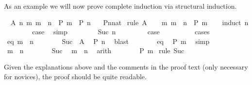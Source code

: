 \begin{isabellebody}
\begin{isamarkuptext}
As an example we will now prove complete induction via
structural induction.%
\end{isamarkuptext}%
\isamarkuptrue%
\ \ A{\isacharcolon}\ {\isachardoublequote}{\isacharparenleft}{\isasymAnd}n{\isachardot}\ {\isacharparenleft}{\isasymAnd}m{\isachardot}\ m\ {\isacharless}\ n\ {\isasymLongrightarrow}\ P\ m{\isacharparenright}\ {\isasymLongrightarrow}\ P\ n{\isacharparenright}{\isachardoublequote}\isanewline
\ \ \ {\isachardoublequote}P{\isacharparenleft}n{\isacharcolon}{\isacharcolon}nat{\isacharparenright}{\isachardoublequote}\isanewline
\isamarkupfalse%
\ {\isacharparenleft}rule\ A{\isacharparenright}\isanewline
\ \ \isamarkupfalse%
\ {\isachardoublequote}{\isasymAnd}m{\isachardot}\ m\ {\isacharless}\ n\ {\isasymLongrightarrow}\ P\ m{\isachardoublequote}\isanewline
\ \ \isamarkupfalse%
\ {\isacharparenleft}induct\ n{\isacharparenright}\isanewline
\ \ \ \ \isamarkupfalse%
\ {}\ \isamarkupfalse%
\ {\isacharquery}case\ \isamarkupfalse%
\ simp\isanewline
\ \ \isamarkupfalse%
\isanewline
\ \ \ \ \isamarkupfalse%
\ {\isacharparenleft}Suc\ n{\isacharparenright}\ \ \ %
\isanewline
\ \ \ \ \isamarkupfalse%
\ {\isacharquery}case\ \ \ \ %
\isanewline
\ \ \ \ \isamarkupfalse%
\ cases\isanewline
\ \ \ \ \ \ \isamarkupfalse%
\ eq{\isacharcolon}\ {\isachardoublequote}m\ {\isacharequal}\ n{\isachardoublequote}\isanewline
\ \ \ \ \ \ \isamarkupfalse%
\ Suc\ \ A\ \isamarkupfalse%
\ {\isachardoublequote}P\ n{\isachardoublequote}\ \isamarkupfalse%
\ blast\isanewline
\ \ \ \ \ \ \isamarkupfalse%
\ eq\ \isamarkupfalse%
\ {\isachardoublequote}P\ m{\isachardoublequote}\ \isamarkupfalse%
\ simp\isanewline
\ \ \ \ \isamarkupfalse%
\isanewline
\ \ \ \ \ \ \isamarkupfalse%
\ {\isachardoublequote}m\ {\isasymnoteq}\ n{\isachardoublequote}\isanewline
\ \ \ \ \ \ \isamarkupfalse%
\ Suc\ \isamarkupfalse%
\ {\isachardoublequote}m\ {\isacharless}\ n{\isachardoublequote}\ \isamarkupfalse%
\ arith\isanewline
\ \ \ \ \ \ \isamarkupfalse%
\ {\isachardoublequote}P\ m{\isachardoublequote}\ \isamarkupfalse%
rule\ Suc{\isacharparenright}\isanewline
\ \ \ \ \isamarkupfalse%
\isanewline
\ \ \isamarkupfalse%
\isanewline
\isamarkupfalse%
\isamarkupfalse%
%
\begin{isamarkuptext}%
\noindent Given the explanations above and the comments in the
proof text (only necessary for novices), the proof should be quite
readable.


\end{isamarkuptext}
\end{isabellebody}
